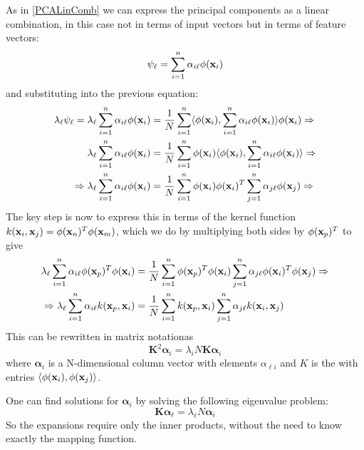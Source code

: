 As in \autoref{PCALinComb} we can express the principal components as a linear combination, in this case not in terms of input vectors but in terms of feature vectors:
\begin{equation}
\psi_\ell  = \sum_{i=1}^n \alpha_{i\ell} \phi(\mathbf{x}_i)
\end{equation}
and substituting into the previous equation:
\begin{equation}
\begin{aligned}
\lambda_\ell \psi_\ell  = \lambda_\ell \sum_{i=1}^n \alpha_{i\ell} \phi(\mathbf{x}_i) &= 
\frac{1}{N}\sum_{i=1}^n \langle \phi(\mathbf{x}_i), \sum_{i=1}^n \alpha_{i\ell} \phi(\mathbf{x}_i)
\rangle \phi(\mathbf{x}_i)\Rightarrow\\
\lambda_\ell \sum_{i=1}^n \alpha_{i\ell} \phi(\mathbf{x}_i) &= \frac{1}{N}\sum_{i=1}^n \phi(\mathbf{x}_i)\langle \phi(\mathbf{x}_i), \sum_{i=1}^n \alpha_{i\ell} \phi(\mathbf{x}_i)
\rangle \Rightarrow\\
\Rightarrow \lambda_\ell \sum_{i=1}^n \alpha_{i\ell} \phi(\mathbf{x}_i) &= 
\frac{1}{N}\sum_{i=1}^n \phi(\mathbf{x}_i) \phi(\mathbf{x}_i)^T \sum_{j=1}^n \alpha_{j\ell} \phi(\mathbf{x}_j)  \Rightarrow
\end{aligned}
\end{equation}
The key step is now to express this in terms of the kernel function $k(\mathbf{x}_i , \mathbf{x}_j ) =
\phi(\mathbf{x}_n)^T\phi(\mathbf{x}_m )$, which we do by multiplying both sides by $\phi(\mathbf{x}_p)^T$ to give
\begin{equation}
\begin{aligned}
 \lambda_\ell \sum_{i=1}^n \alpha_{i\ell} \phi(\mathbf{x}_p)^T\phi(\mathbf{x}_i) &= 
\frac{1}{N}\sum_{i=1}^n \phi(\mathbf{x}_p)^T\phi(\mathbf{x}_i)  \sum_{j=1}^n \alpha_{j\ell} \phi(\mathbf{x}_i)^T\phi(\mathbf{x}_j)\Rightarrow\\
\Rightarrow  \lambda_\ell \sum_{i=1}^n \alpha_{i\ell} k(\mathbf{x}_p,\mathbf{x}_i) &= 
\frac{1}{N}\sum_{i=1}^n k(\mathbf{x}_p,\mathbf{x}_i)  \sum_{j=1}^n \alpha_{j\ell} k(\mathbf{x}_i,\mathbf{x}_j)
\end{aligned}
\end{equation}
This can be rewritten in matrix notationas
\begin{equation}
\mathbf{K}^2\mathbf{\alpha}_i = \lambda_i N  \mathbf{K} \mathbf{\alpha}_i
\end{equation}
where $\mathbf{\alpha}_i$ is a N-dimensional column vector with elements $\alpha_{\ell i}$ and $K$ is the  with entries $\langle \phi(\mathbf{x}_i), \phi(\mathbf{x}_j)\rangle$.

One can find solutions for $\mathbf{\alpha}_i$ by solving the following eigenvalue problem:
\begin{equation}
\mathbf{K\alpha}_\ell = \lambda_\ell N\mathbf{\alpha}_i
\end{equation}
So the expansions require only the inner products, without the need to know exactly the mapping function.

